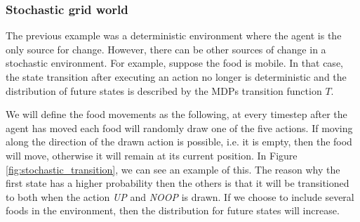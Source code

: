 \documentclass[12pt,A4]{report}
\theoremstyle{definition}
\begin{document}
\subsubsection{Stochastic grid world}
The previous example was a deterministic environment where the agent is the only source for change. However, there can be other sources of change in a stochastic environment. For example, suppose the food is mobile. In that case, the state transition after executing an action no longer is deterministic and the distribution of future states is described by the MDPs transition function $T$.

We will define the food movements as the following, at every timestep after the agent has moved each food will randomly draw one of the five actions. If moving along the direction of the drawn action is possible, i.e. it is empty, then the food will move, otherwise it will remain at its current position. In Figure \ref{fig:stochastic_transition}, we can see an example of this. The reason why the first state has a higher probability then the others is that it will be transitioned to both when the action \textit{UP} and \textit{NOOP} is drawn. If we choose to include several foods in the environment, then the distribution for future states will increase.
\end{document}

